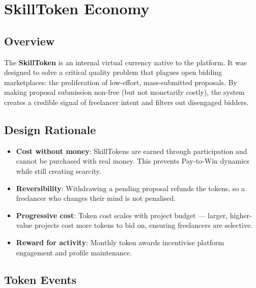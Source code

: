 \chapter{SkillToken Economy}

\section{Overview}

The \textbf{SkillToken} is an internal virtual currency native to the \projectname{} platform. It was designed to solve a critical quality problem that plagues open bidding marketplaces: the proliferation of low-effort, mass-submitted proposals. By making proposal submission non-free (but not monetarily costly), the system creates a credible signal of freelancer intent and filters out disengaged bidders.

\section{Design Rationale}

\begin{itemize}
  \item \textbf{Cost without money}: SkillTokens are earned through participation and cannot be purchased with real money. This prevents Pay-to-Win dynamics while still creating scarcity.
  \item \textbf{Reversibility}: Withdrawing a pending proposal refunds the tokens, so a freelancer who changes their mind is not penalised.
  \item \textbf{Progressive cost}: Token cost scales with project budget — larger, higher-value projects cost more tokens to bid on, ensuring freelancers are selective.
  \item \textbf{Reward for activity}: Monthly token awards incentivise platform engagement and profile maintenance.
\end{itemize}

\section{Token Events}

